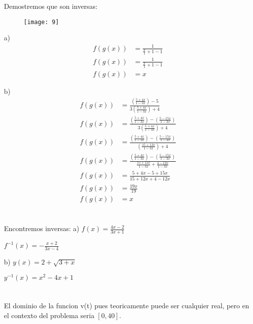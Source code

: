 \documentclass[journal,onecolumn,10pt,fleqn]{IEEEtran}%
\theoremstyle{break}                                            %
\begin{document}
\section{}


Demostremos que son inversas:

\begin{figure}[ht]
  \texttt{[image: 9]}
\end{figure}

a)
\begin{align*}
  f(g(x)) &= \frac{1}{\frac{x}{1} + 1 - 1} \\
  f(g(x)) &= \frac{1}{\frac{x}{1} + 1 - 1} \\
  f(g(x)) &= x
\end{align*}

b)
\begin{align*}
  f(g(x)) &= \frac{(\frac{5 + 4x}{1 - 3x}) - 5}{3(\frac{5 + 4x}{1 - 3x}) + 4}  \\
  f(g(x)) &= \frac{(\frac{5 + 4x}{1 - 3x}) - (\frac{5 - 15x}{1 - 3x})}{3(\frac{5 + 4x}{1 - 3x}) + 4} \\
  f(g(x)) &= \frac{(\frac{5 + 4x}{1 - 3x}) - (\frac{5 - 15x}{1 - 3x})}{(\frac{15 + 12x}{1 - 3x}) + 4}  \\
  f(g(x)) &= \frac{(\frac{5 + 4x}{1 - 3x}) - (\frac{5 - 15x}{1 - 3x})}{\frac{15 + 12x}{1 - 3x} + \frac{4 - 12x}{1 - 3x}} \\
  f(g(x)) &= \frac{5 + 4x - 5 + 15x}{15 + 12x + 4 - 12x}  \\
  f(g(x)) &= \frac{19x}{19} \\
  f(g(x)) &= x
\end{align*}


\section{}

Encontremos inversas:
a)
$f(x) = \frac{4x - 2}{3x + 1}$

$f^{-1}(x) = -\frac{x + 2}{3x - 4}$

b)
$y(x) = 2 + \sqrt{3 + x}$

$y^{-1}(x) = x^2 -4x + 1$

\clearpage
\section{}

El dominio de la funcion v(t) pues teoricamente puede ser cualquier real, pero en el contexto del problema
seria $[0, 40]$.
\end{document}
